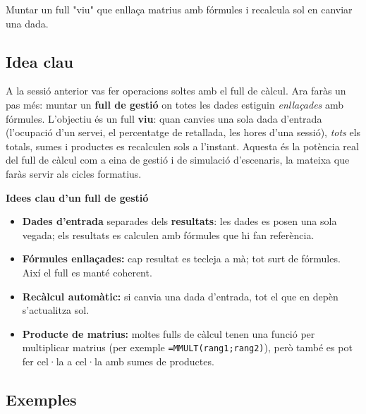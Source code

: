 %
{Muntar un full "viu" que enllaça matrius amb fórmules i recalcula sol en canviar una dada.}

\subsection{Idea clau}

A la sessió anterior vas fer operacions soltes amb el full de càlcul. Ara faràs un
pas més: muntar un \textbf{full de gestió} on totes les dades estiguin
\emph{enllaçades} amb fórmules. L'objectiu és un full \textbf{viu}: quan canvies
una sola dada d'entrada (l'ocupació d'un servei, el percentatge de retallada, les
hores d'una sessió), \emph{tots} els totals, sumes i productes es recalculen sols
a l'instant. Aquesta és la potència real del full de càlcul com a eina de gestió i
de simulació d'escenaris, la mateixa que faràs servir als cicles formatius.

\begin{idea}
\textbf{Idees clau d'un full de gestió}
\begin{itemize}[leftmargin=1.4em, itemsep=2pt]
  \item \textbf{Dades d'entrada} separades dels \textbf{resultats}: les dades es
        posen una sola vegada; els resultats es calculen amb fórmules que hi fan
        referència.
  \item \textbf{Fórmules enllaçades:} cap resultat es tecleja a mà; tot surt de
        fórmules. Així el full es manté coherent.
  \item \textbf{Recàlcul automàtic:} si canvia una dada d'entrada, tot el que en
        depèn s'actualitza sol.
  \item \textbf{Producte de matrius:} moltes fulls de càlcul tenen una funció per
        multiplicar matrius (per exemple \texttt{=MMULT(rang1;rang2)}), però
        també es pot fer cel·la a cel·la amb sumes de productes.
\end{itemize}
\end{idea}

\subsection{Exemples}

